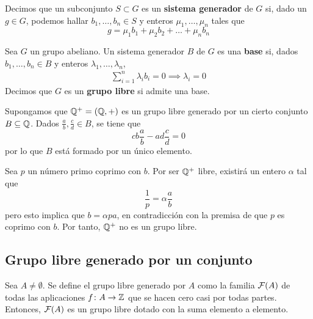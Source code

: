 Decimos que un subconjunto $S \subset G$ es un \textbf{sistema generador} de $G$
si, dado un $g \in G$, podemos hallar $b_1,\dots,b_n \in S$ y enteros
$\mu_1,\dots,\mu_n$ tales que
\[g=\mu_1b_1+\mu_2b_2+\dots+\mu_nb_n\]

\begin{definition}
Sea $G$ un grupo abeliano. Un sistema generador $B$ de $G$ es una \textbf{base}
si, dados $b_1,\dots,b_n \in B$ y enteros $\lambda_1,\dots,\lambda_n$,
\begin{align}
\label{SisLibre} \sum^n_{i=1}\lambda_ib_i=0 \implies \lambda_i=0
\end{align}
Decimos que $G$ es un \textbf{grupo libre} si admite una base.
\end{definition}

\begin{example}
Supongamos que $\mathbb{Q}^+=(\mathbb{Q},+)$ es un grupo libre generado por un cierto
conjunto $B \subseteq \mathbb{Q}$. Dados $\frac{a}{b}, \frac{c}{d} \in B$, se tiene
que
\[cb\frac{a}{b}-ad\frac{c}{d}=0\]
por lo que $B$ está formado por un único elemento.

Sea $p$ un número primo coprimo con $b$. Por ser $\mathbb{Q}^+$ libre, existirá un
entero $\alpha$ tal que
\[\frac{1}{p}=\alpha\frac{a}{b}\]
pero esto implica que $b=\alpha pa$, en contradicción con la premisa de que $p$
es coprimo con $b$. Por tanto, $\mathbb{Q}^+$ no es un grupo libre.
\end{example}

\subsection{Grupo libre generado por un conjunto}
\begin{proposition}
Sea $A \neq\emptyset$. Se define el grupo libre generado por $A$ como la familia
$\mathcal{F}(A)$ de todas las aplicaciones $f\colon A \to \mathbb{Z}$ que se
hacen cero casi por todas partes. Entonces, $\mathcal{F}(A)$ es un grupo libre dotado
con la suma elemento a elemento.
\end{proposition}

